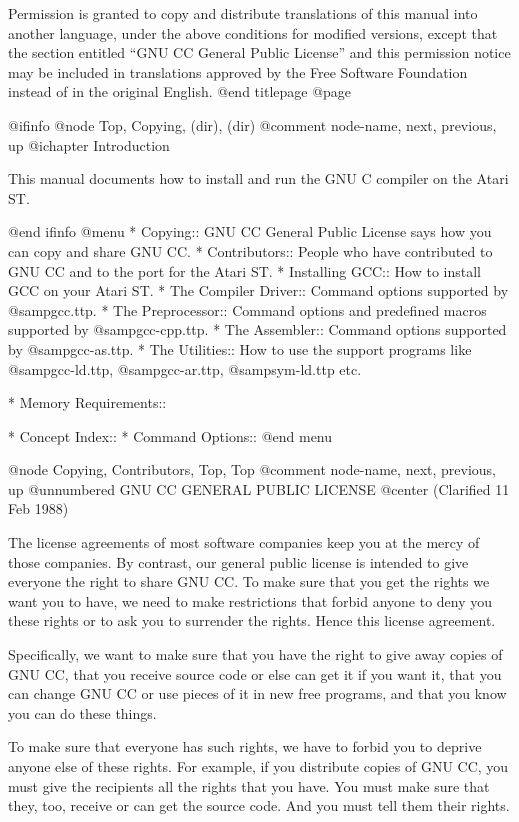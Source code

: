 Permission is granted to copy and distribute translations of this manual
into another language, under the above conditions for modified versions,
except that the section entitled ``GNU CC General Public License'' and
this permission notice may be included in translations approved by the
Free Software Foundation instead of in the original English.
@end titlepage
@page

@ifinfo
@node     Top,        Copying, (dir),     (dir)
@comment  node-name,  next,    previous,  up
@ichapter Introduction

This manual documents how to install and run the GNU C compiler on
the Atari ST. 

@end ifinfo
@menu
* Copying::             GNU CC General Public License says
                         how you can copy and share GNU CC.
* Contributors::        People who have contributed to GNU CC
                         and to the port for the Atari ST.
* Installing GCC::      How to install GCC on your Atari ST.
* The Compiler Driver:: Command options supported by @samp{gcc.ttp}.
* The Preprocessor::    Command options and predefined macros supported
                        by @samp{gcc-cpp.ttp}.
* The Assembler::       Command options supported by @samp{gcc-as.ttp}.
* The Utilities::       How to use the support programs like @samp{gcc-ld.ttp},
                         @samp{gcc-ar.ttp}, @samp{sym-ld.ttp} etc.

* Memory Requirements::

* Concept Index::
* Command Options::
@end menu

@node     Copying,    Contributors, Top,       Top
@comment  node-name,  next,         previous,  up
@unnumbered GNU CC GENERAL PUBLIC LICENSE
@center (Clarified 11 Feb 1988)

  The license agreements of most software companies keep you at the
mercy of those companies.  By contrast, our general public license is
intended to give everyone the right to share GNU CC.  To make sure that
you get the rights we want you to have, we need to make restrictions
that forbid anyone to deny you these rights or to ask you to surrender
the rights.  Hence this license agreement.

  Specifically, we want to make sure that you have the right to give
away copies of GNU CC, that you receive source code or else can get it
if you want it, that you can change GNU CC or use pieces of it in new
free programs, and that you know you can do these things.

  To make sure that everyone has such rights, we have to forbid you to
deprive anyone else of these rights.  For example, if you distribute
copies of GNU CC, you must give the recipients all the rights that you
have.  You must make sure that they, too, receive or can get the
source code.  And you must tell them their rights.

